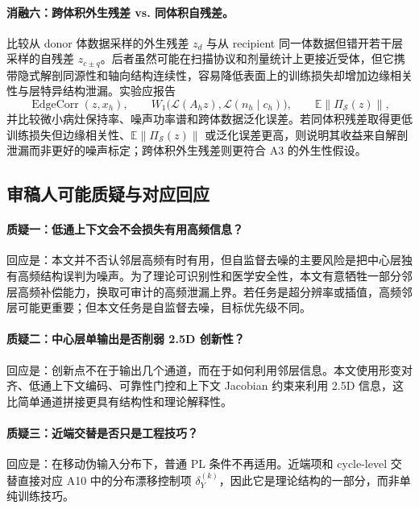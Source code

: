\documentclass[11pt,a4paper,UTF8,fontset=fandol]{ctexart}
\theoremstyle{definition}
\newcommand{\norm}[1]{\left\lVert#1\right\rVert}
\newcommand{\E}{\mathbb{E}}
\newcommand{\cS}{\mathcal{S}}
\begin{document}
\paragraph{消融六：跨体积外生残差 vs. 同体积自残差。}
比较从 donor 体数据采样的外生残差 $z_d$ 与从 recipient 同一体数据但错开若干层采样的自残差 $z_{c\pm q}$。后者虽然可能在扫描协议和剂量统计上更接近受体，但它携带隐式解剖同源性和轴向结构连续性，容易降低表面上的训练损失却增加边缘相关性与层特异结构泄漏。实验应报告
\begin{equation}
    \operatorname{EdgeCorr}(z,x_h),
    \qquad
    W_1\big(\mathcal L(A_hz),\mathcal L(n_h\mid c_h)\big),
    \qquad
    \E\norm{\Pi_{\cS}(z)},
\end{equation}
并比较微小病灶保持率、噪声功率谱和跨体数据泛化误差。若同体积残差取得更低训练损失但边缘相关性、$\E\norm{\Pi_{\cS}(z)}$ 或泛化误差更高，则说明其收益来自解剖泄漏而非更好的噪声标定；跨体积外生残差则更符合 A3 的外生性假设。

\subsection{审稿人可能质疑与对应回应}

\paragraph{质疑一：低通上下文会不会损失有用高频信息？}
回应是：本文并不否认邻层高频有时有用，但自监督去噪的主要风险是把中心层独有高频结构误判为噪声。为了理论可识别性和医学安全性，本文有意牺牲一部分邻层高频补偿能力，换取可审计的高频泄漏上界。若任务是超分辨率或插值，高频邻层可能更重要；但本文任务是自监督去噪，目标优先级不同。

\paragraph{质疑二：中心层单输出是否削弱 2.5D 创新性？}
回应是：创新点不在于输出几个通道，而在于如何利用邻层信息。本文使用形变对齐、低通上下文编码、可靠性门控和上下文 Jacobian 约束来利用 2.5D 信息，这比简单通道拼接更具有结构性和理论解释性。

\paragraph{质疑三：近端交替是否只是工程技巧？}
回应是：在移动伪输入分布下，普通 PL 条件不再适用。近端项和 cycle-level 交替直接对应 A10 中的分布漂移控制项 $\delta_Y^{(k)}$，因此它是理论结构的一部分，而非单纯训练技巧。
\end{document}

